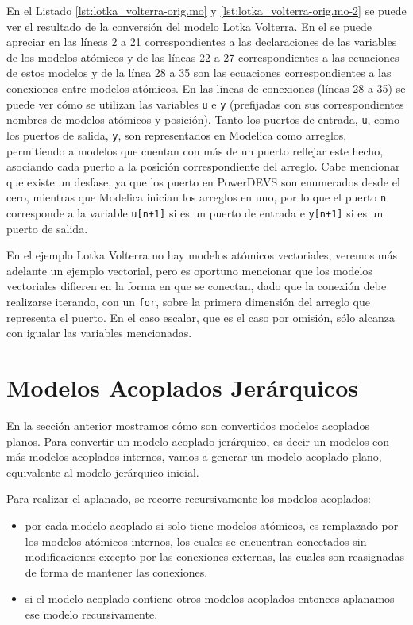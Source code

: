         En el Listado \ref{lst:lotka_volterra-orig.mo} y  \ref{lst:lotka_volterra-orig.mo-2} se puede ver el resultado de la conversión del modelo Lotka Volterra.  En el se puede apreciar en las líneas 2 a 21 correspondientes a las declaraciones de las variables de los modelos atómicos y de las líneas 22 a 27
	correspondientes a las ecuaciones de estos modelos y de la línea 28 a 35 son las ecuaciones correspondientes a las conexiones entre modelos atómicos.
        En las líneas de conexiones (líneas 28 a 35) se puede ver cómo se utilizan las variables \texttt{u} e \texttt{y} (prefijadas con sus correspondientes nombres 
	de modelos atómicos y posición). Tanto los puertos de entrada, \texttt{u}, como los puertos de salida, \texttt{y}, son representados en Modelica como arreglos,
        permitiendo a modelos que cuentan con más de un puerto reflejar este hecho, asociando cada puerto a la posición correspondiente del arreglo. 
        Cabe mencionar que existe un desfase, ya que los puerto en PowerDEVS son enumerados desde el cero, mientras que Modelica inician los arreglos en uno, por lo
        que el puerto \texttt{n} corresponde a la variable \texttt{u[n+1]} si es un puerto de entrada e \texttt{y[n+1]} si es un puerto de salida.

        En el ejemplo Lotka Volterra no hay modelos atómicos vectoriales, veremos más adelante un ejemplo vectorial, pero es oportuno mencionar que los modelos
        vectoriales difieren en la forma en que se conectan, dado que la conexión debe realizarse iterando, con un \texttt{for}, sobre la primera dimensión del 
        arreglo que representa el puerto. En el caso escalar, que es el caso por omisión, sólo alcanza con igualar las variables mencionadas.


\section{Modelos Acoplados Jerárquicos} \label{aplanado}
        En la sección anterior mostramos cómo son convertidos modelos acoplados planos. Para convertir un modelo acoplado jerárquico, es decir un modelos con más 
        modelos acoplados internos, vamos a generar un modelo acoplado plano, equivalente al modelo jerárquico inicial.

        Para realizar el aplanado, se recorre recursivamente los modelos acoplados:

        \begin{itemize}
                \item por cada modelo acoplado si solo tiene modelos atómicos, es remplazado por los modelos atómicos internos, los cuales se encuentran conectados 
                        sin modificaciones excepto por las conexiones externas, las cuales son reasignadas de forma de mantener las conexiones.
                \item si el modelo acoplado contiene otros modelos acoplados entonces aplanamos ese modelo recursivamente.
        \end{itemize} 

